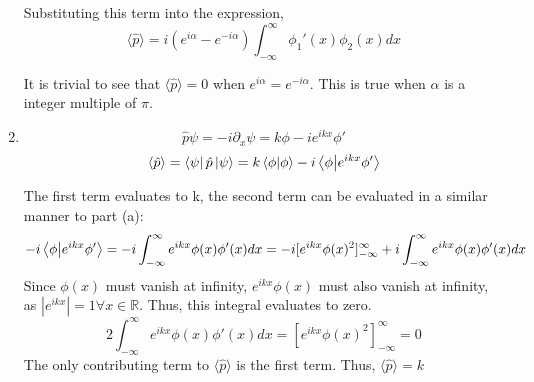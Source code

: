 \begin{sol}
\begin{enumerate}[label=\textbf{(\alph*)}]
Substituting this term into the expression,  
\begin{equation}
  \langle\hat{p}\rangle=i(e^{i\alpha}-e^{-i\alpha})\int_{-\infty}^{\infty}\phi_1'(x)\phi_2(x)dx
\end{equation}

It is trivial to see that $\langle\hat{p}\rangle=0$ when $e^{i\alpha}=e^{-i\alpha}$. This is true when $\alpha$ is a integer multiple of $\pi$.
\item 
\begin{equation}
  \hat{p}\psi=-i\partial_x\psi=k\phi-ie^{ikx}\phi'
\end{equation} 
\begin{equation}
  \langle\hat{p}\rangle=\bra{\psi}\hat{p}\ket{\psi}=k\braket{\phi}{\phi}-i\braket{\phi}{e^{ikx}\phi'}
\end{equation}

The first term evaluates to k, the second term can be evaluated in a similar manner to part (a):
\begin{equation}
  -i\braket{\phi}{e^{ikx}\phi'}=-i\int_{-\infty}^{\infty}e^{ikx}\phi(x)\phi'(x)dx=-i[e^{ikx}\phi(x)^2]_{-\infty}^{\infty}+i\int_{-\infty}^{\infty}e^{ikx}\phi(x)\phi'(x)dx
\end{equation}
Since $\phi(x)$ must vanish at infinity, $e^{ikx}\phi(x)$ must also vanish at infinity, as $|e^{ikx}|=1\forall x\in\mathbb{R}$. Thus, this integral evaluates to zero.
\begin{equation}
  2\int_{-\infty}^{\infty}e^{ikx}\phi(x)\phi'(x)dx=[e^{ikx}\phi(x)^2]_{-\infty}^{\infty}=0
\end{equation}
The only contributing term to $\langle\hat{p}\rangle$ is the first term. Thus, $\langle\hat{p}\rangle=k$
\end{enumerate}
\end{sol}